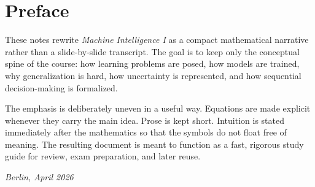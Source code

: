\section*{Preface}

These notes rewrite \emph{Machine Intelligence I} as a compact mathematical narrative rather than a slide-by-slide transcript. The goal is to keep only the conceptual spine of the course: how learning problems are posed, how models are trained, why generalization is hard, how uncertainty is represented, and how sequential decision-making is formalized.

The emphasis is deliberately uneven in a useful way. Equations are made explicit whenever they carry the main idea. Prose is kept short. Intuition is stated immediately after the mathematics so that the symbols do not float free of meaning. The resulting document is meant to function as a fast, rigorous study guide for review, exam preparation, and later reuse.

\bigskip
\noindent\textit{Berlin, April 2026}
